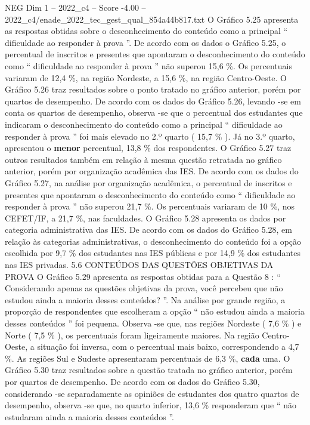 \begin{textsample}{NEG Dim 1 – 2022\_c4 – Score -4.00 – 2022\_c4/enade\_2022\_tec\_gest\_qual\_854a44b817.txt}
O Gráfico 5.25 apresenta as respostas obtidas sobre o desconhecimento do conteúdo como a principal “ dificuldade ao responder à prova ”.
De acordo com os dados o Gráfico 5.25, o percentual de inscritos e presentes que apontaram o desconhecimento do conteúdo como “ dificuldade ao responder à prova ” não superou 15,6 \%.
Os percentuais variaram de 12,4 \%, na região Nordeste, a 15,6 \%, na região Centro-Oeste.
O Gráfico 5.26 traz resultados sobre o ponto tratado no gráfico anterior, porém por quartos de desempenho.
De acordo com os dados do Gráfico 5.26, levando -se em conta os quartos de desempenho, observa -se que o percentual dos estudantes que indicaram o desconhecimento do conteúdo como a principal “ dificuldade ao responder à prova ” foi mais elevado no 2.º quarto ( 15,7 \% ).
Já no 3.º quarto, apresentou o \textbf{menor} percentual, 13,8 \% dos respondentes.
O Gráfico 5.27 traz outros resultados também em relação à mesma questão retratada no gráfico anterior, porém por organização acadêmica das IES.
De acordo com os dados do Gráfico 5.27, na análise por organização acadêmica, o percentual de inscritos e presentes que apontaram o desconhecimento do conteúdo como “ dificuldade ao responder à prova ” não superou 21,7 \%.
Os percentuais variaram de 10 \%, nos CEFET/IF, a 21,7 \%, nas faculdades.
O Gráfico 5.28 apresenta os dados por categoria administrativa das IES.
De acordo com os dados do Gráfico 5.28, em relação às categorias administrativas, o desconhecimento do conteúdo foi a opção escolhida por 9,7 \% dos estudantes nas IES públicas e por 14,9 \% dos estudantes nas IES privadas. 5.6 CONTEÚDOS DAS QUESTÕES OBJETIVAS DA PROVA O Gráfico 5.29 apresenta as respostas obtidas para a Questão 8 : “ Considerando apenas as questões objetivas da prova, você percebeu que não estudou ainda a maioria desses conteúdos? ”.
Na análise por grande região, a proporção de respondentes que escolheram a opção “ não estudou ainda a maioria desses conteúdos ” foi pequena.
Observa -se que, nas regiões Nordeste ( 7,6 \% ) e Norte ( 7,5 \% ), os percentuais foram ligeiramente maiores.
Na região Centro-Oeste, a situação foi inversa, com o percentual mais baixo, correspondendo a 4,7 \%.
As regiões Sul e Sudeste apresentaram percentuais de 6,3 \%, \textbf{cada} uma.
O Gráfico 5.30 traz resultados sobre a questão tratada no gráfico anterior, porém por quartos de desempenho.
De acordo com os dados do Gráfico 5.30, considerando -se separadamente as opiniões de estudantes dos quatro quartos de desempenho, observa -se que, no quarto inferior, 13,6 \% responderam que “ não estudaram ainda a maioria desses conteúdos ”.

\end{textsample}
